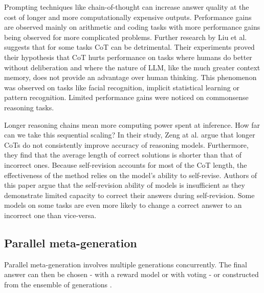 Prompting techniques like chain-of-thought can increase answer quality 
at the cost of longer and more computationally expensive outputs. \cite{brown2024largelanguagemonkeysscaling}
Performance gains are observed mainly on arithmetic and coding tasks with more performance gains 
being observed for more complicated problems\cite{wei2023chainofthoughtpromptingelicitsreasoning}.
Further research by Liu et al.\cite{liu2024mindstepbystep} suggests that for some tasks CoT can be detrimental.
Their experiments proved their hypothesis that CoT hurts performance on tasks where humans do better without deliberation
and where the nature of LLM, like the much greater context memory, does not provide an advantage over human thinking. 
This phenomenon was observed on tasks like facial recognition, implicit statistical learning or pattern recognition.
Limited performance gains were noticed on commonsense reasoning tasks\cite{NEURIPS2022_8bb0d291}.

Longer reasoning chains mean more computing power spent at inference. How far can we take this sequential scaling?
In their study, Zeng at al.\cite{zeng2025revisitingtesttimescalingo1like} argue that longer CoTs do not consistently improve accuracy of reasoning models.
Furthermore, they find that the average length of correct solutions is shorter than that of incorrect ones. 
Because self-revision accounts for most of the CoT length, the effectiveness of the method relies on the model's ability to self-revise.
Authors of this paper argue that the self-revision ability of models is insufficient as they demonstrate limited capacity to correct their answers
during self-revision. Some models on some tasks are even more likely to change a correct answer to an incorrect one than vice-versa.

\subsection{Parallel meta-generation}

Parallel meta-generation involves multiple generations concurrently. 
The final answer can then be chosen - with a reward model or with 
voting - or constructed from the ensemble of generations \cite{welleck2024decodingmetagenerationinferencetimealgorithms}.


